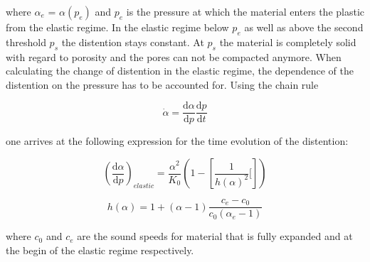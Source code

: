 where $\alpha_e$ = $\alpha\left(p_e\right)$ and $p_e$ is the pressure at which the material enters the plastic from the elastic regime. In the elastic regime below $p_e$ as well as above the second threshold $p_s$ the distention stays constant. At $p_s$ the material is completely solid with regard to porosity and the pores can not be compacted anymore. When calculating the change of distention in the elastic regime, the dependence of the distention on the pressure has to be accounted for. Using the chain rule

\begin{equation}
    \dot{\alpha} = \frac{\mathrm{d}\alpha}{\mathrm{d}p}\frac{\mathrm{d}p}{\mathrm{d}t}
\end{equation}

one arrives at the following expression for the time evolution of the distention:

\begin{equation}
    \left(\frac{\mathrm{d}\alpha}{\mathrm{d}p}\right)_{elastic} = \frac{\alpha^2}{K_0}\left(1 - \left[ \frac{1}{h(\alpha)^2}[\right]\right)
\end{equation}

\begin{equation}
    h(\alpha) = 1 + (\alpha - 1)\frac{c_e - c_0}{c_0(\alpha_e - 1)}
\end{equation}

where $c_0$ and $c_e$ are the sound speeds for material that is fully expanded and at the begin of the elastic regime respectively.
